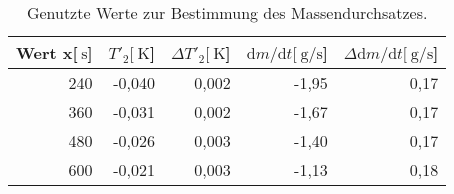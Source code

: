 
\begin{table}[h!]
\begin{center}
\begin{tabular}{|r|r|r|r|r|}
\hline
Wert x[$\SI{}{\second}$] & $T'_\mathrm{2}[\SI{}{\kelvin}$] & $\Delta T'_\mathrm{2}[\SI{}{\kelvin}$]& $\mathrm{d}m/\mathrm{d}t[\SI{}{\gram\per\second}$] & $\Delta\mathrm{d}m/\mathrm{d}t[\SI{}{\gram\per\second}$]\\
\hline
\hline
240 &	-0,040 &	0,002 &	-1,95 &	0,17\\
360 &	-0,031 &	0,002 &	-1,67 &	0,17\\
480 &	-0,026 &	0,003 &	-1,40 &	0,17\\
600 &	-0,021 &	0,003 &	-1,13 &	0,18\\
\hline
\end{tabular}
\caption[]{Genutzte Werte zur Bestimmung des Massendurchsatzes.}
\label{masse}
\end{center}
\end{table}